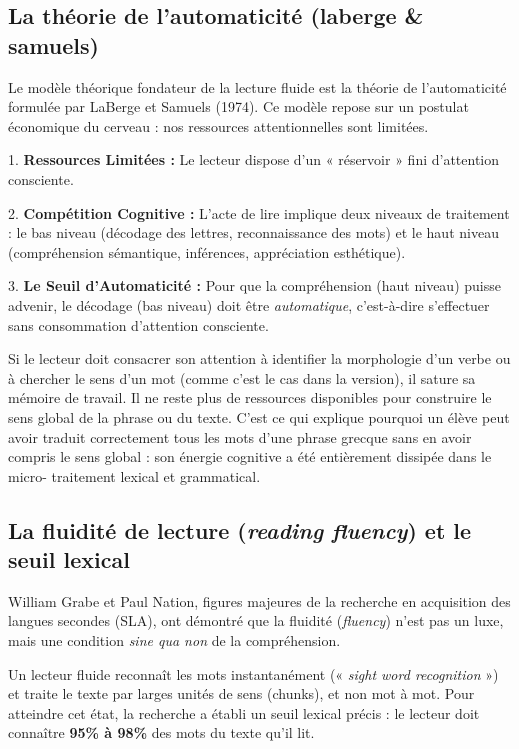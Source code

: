 \subsection{La théorie de l'automaticité (laberge \& samuels)}

Le modèle théorique fondateur de la lecture fluide est la théorie de l'automaticité formulée par
LaBerge et Samuels (1974).\cite{II-3-1-ref5} Ce modèle repose sur un postulat économique du cerveau
: nos ressources attentionnelles sont limitées.

1. \textbf{Ressources Limitées :} Le lecteur dispose d'un « réservoir » fini d'attention consciente.

2. \textbf{Compétition Cognitive :} L'acte de lire implique deux niveaux de traitement : le bas
niveau (décodage des lettres, reconnaissance des mots) et le haut niveau (compréhension sémantique,
inférences, appréciation esthétique).

3. \textbf{Le Seuil d'Automaticité :} Pour que la compréhension (haut niveau) puisse advenir, le
décodage (bas niveau) doit être \textit{automatique}, c'est-à-dire s'effectuer sans consommation
d'attention consciente.\cite{II-3-1-ref20}

Si le lecteur doit consacrer son attention à identifier la morphologie d'un verbe ou à chercher le
sens d'un mot (comme c'est le cas dans la version), il sature sa mémoire de travail. Il ne reste
plus de ressources disponibles pour construire le sens global de la phrase ou du texte. C'est ce qui
explique pourquoi un élève peut avoir traduit correctement tous les mots d'une phrase grecque sans
en avoir compris le sens global : son énergie cognitive a été entièrement dissipée dans le micro-
traitement lexical et grammatical.\cite{II-3-1-ref22}



\subsection{La fluidité de lecture (\textit{reading fluency}) et le seuil lexical}

William Grabe et Paul Nation, figures majeures de la recherche en acquisition des langues secondes
(SLA), ont démontré que la fluidité (\textit{fluency}) n'est pas un luxe, mais une condition
\textit{sine qua non} de la compréhension.\cite{II-3-1-ref23}

Un lecteur fluide reconnaît les mots instantanément (« \textit{sight word recognition} ») et traite
le texte par larges unités de sens (chunks), et non mot à mot. Pour atteindre cet état, la recherche
a établi un seuil lexical précis : le lecteur doit connaître \textbf{95\% à 98\%} des mots du texte
qu'il lit.\cite{II-3-1-ref26}

